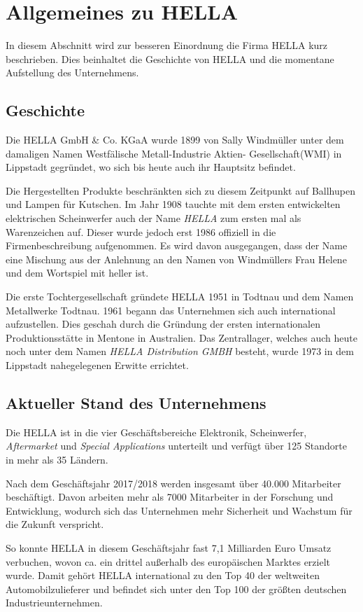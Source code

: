 \documentclass[12pt]{report}
\begin{document}
\section{Allgemeines zu HELLA}
In diesem Abschnitt wird zur besseren Einordnung die Firma HELLA kurz beschrieben. Dies beinhaltet die Geschichte von HELLA und die momentane Aufstellung des Unternehmens. \cite{he18} \cite{he19}

\subsection{Geschichte}
Die HELLA GmbH \& Co. KGaA wurde 1899 von Sally Windmüller unter dem damaligen Namen \glqq Westfälische Metall-Industrie Aktien- Gesellschaft(WMI)\grqq{} in Lippstadt gegründet, wo sich bis heute auch ihr Hauptsitz befindet. 

Die Hergestellten Produkte beschränkten sich zu diesem Zeitpunkt auf Ballhupen und Lampen für Kutschen. Im Jahr 1908 tauchte mit dem ersten entwickelten elektrischen Scheinwerfer auch der Name \textit{HELLA} zum ersten mal als Warenzeichen auf. Dieser wurde jedoch erst 1986 offiziell in die Firmenbeschreibung aufgenommen. Es wird davon ausgegangen, dass der Name eine Mischung aus der Anlehnung an den Namen von Windmüllers Frau Helene und dem Wortspiel mit \glqq heller\grqq{} ist. 

Die erste Tochtergesellschaft gründete HELLA 1951 in Todtnau und dem Namen \glqq Metallwerke Todtnau\grqq. 1961 begann das Unternehmen sich auch international aufzustellen. Dies geschah durch die Gründung der ersten internationalen Produktionsstätte in Mentone in Australien. 
Das Zentrallager, welches auch heute noch unter dem Namen \textit{HELLA Distribution GMBH} besteht, wurde 1973 in dem Lippstadt nahegelegenen Erwitte errichtet. 
\subsection[Aktueller Stand]{Aktueller Stand des Unternehmens}
Die HELLA ist in die vier Geschäftsbereiche Elektronik, Scheinwerfer, \textit{Aftermarket} und \textit{Special Applications} unterteilt und verfügt über 125 Standorte in mehr als 35 Ländern.

Nach dem Geschäftsjahr 2017/2018 werden insgesamt über 40.000 Mitarbeiter beschäftigt. Davon arbeiten mehr als 7000 Mitarbeiter in der Forschung und Entwicklung, wodurch sich das Unternehmen mehr Sicherheit und Wachstum für die Zukunft verspricht. 

So konnte HELLA in diesem Geschäftsjahr fast 7,1 Milliarden Euro Umsatz verbuchen, wovon ca. ein drittel außerhalb des europäischen Marktes erzielt wurde. Damit gehört HELLA international zu den Top 40 der weltweiten Automobilzulieferer und befindet sich unter den Top 100 der größten deutschen Industrieunternehmen. 
\end{document}
